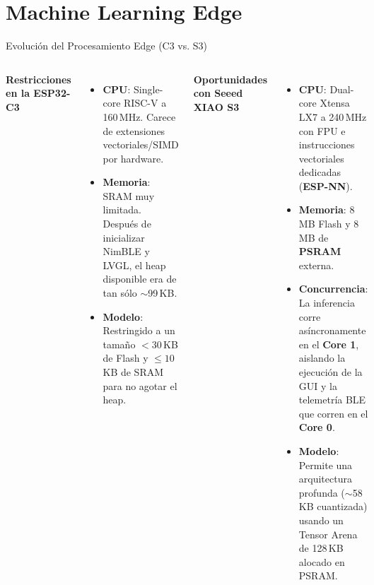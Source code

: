 \documentclass[aspectratio=169, 10pt]{beamer}
\begin{document}
\section{Machine Learning Edge}

\begin{frame}{Evoluci\'on del Procesamiento Edge (C3 vs. S3)}
    \begin{columns}[T]
        \scriptsize
        \textbf{Restricciones en la ESP32-C3}
        \begin{itemize}\itemsep0.1cm
            \item \textbf{CPU}: Single-core RISC-V a 160\,MHz. Carece de extensiones vectoriales/SIMD por hardware.
            \item \textbf{Memoria}: SRAM muy limitada. Despu\'es de inicializar NimBLE y LVGL, el heap disponible era de tan s\'olo $\sim$99\,KB.
            \item \textbf{Modelo}: Restringido a un tama\~no $<30$\,KB de Flash y $\leq 10$\,KB de SRAM para no agotar el heap.
        \end{itemize}
        
        \scriptsize
        \textbf{Oportunidades con Seeed XIAO S3}
        \begin{itemize}\itemsep0.1cm
            \item \textbf{CPU}: Dual-core Xtensa LX7 a 240\,MHz con FPU e instrucciones vectoriales dedicadas (\textbf{ESP-NN}).
            \item \textbf{Memoria}: 8\,MB Flash y 8\,MB de \textbf{PSRAM} externa.
            \item \textbf{Concurrencia}: La inferencia corre as\'incronamente en el \textbf{Core 1}, aislando la ejecuci\'on de la GUI y la telemetr\'ia BLE que corren en el \textbf{Core 0}.
            \item \textbf{Modelo}: Permite una arquitectura profunda ($\sim$58\,KB cuantizada) usando un Tensor Arena de 128\,KB alocado en PSRAM.
        \end{itemize}
    \end{columns}
\end{frame}
\end{document}
